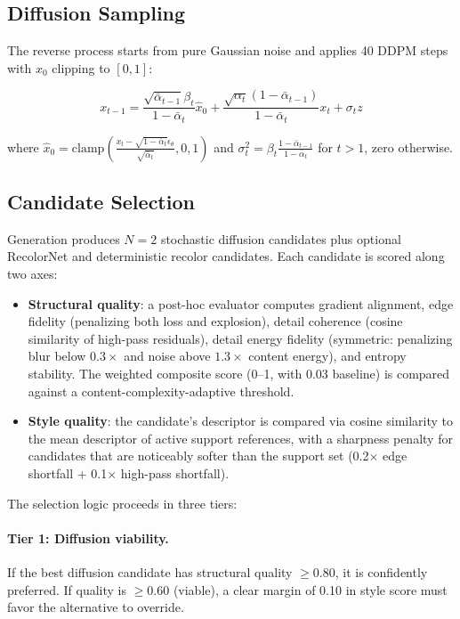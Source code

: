 \subsection{Diffusion Sampling}

The reverse process starts from pure Gaussian noise and applies 40 DDPM steps with $x_0$ clipping to $[0,1]$:

\begin{equation}
    x_{t-1} = \frac{\sqrt{\bar{\alpha}_{t-1}}\beta_t}{1-\bar{\alpha}_t}\hat{x}_0 + \frac{\sqrt{\alpha_t}(1-\bar{\alpha}_{t-1})}{1-\bar{\alpha}_t}x_t + \sigma_t z
\end{equation}

where $\hat{x}_0 = \text{clamp}(\frac{x_t - \sqrt{1-\bar{\alpha}_t}\epsilon_\theta}{\sqrt{\bar{\alpha}_t}}, 0, 1)$ and $\sigma_t^2 = \beta_t\frac{1-\bar{\alpha}_{t-1}}{1-\bar{\alpha}_t}$ for $t>1$, zero otherwise.

\subsection{Candidate Selection}

Generation produces $N=2$ stochastic diffusion candidates plus optional RecolorNet and deterministic recolor candidates. Each candidate is scored along two axes:

\begin{itemize}
    \item \textbf{Structural quality}: a post-hoc evaluator computes gradient alignment, edge fidelity (penalizing both loss and explosion), detail coherence (cosine similarity of high-pass residuals), detail energy fidelity (symmetric: penalizing blur below $0.3\times$ and noise above $1.3\times$ content energy), and entropy stability. The weighted composite score (0--1, with 0.03 baseline) is compared against a content-complexity-adaptive threshold.
    \item \textbf{Style quality}: the candidate's descriptor is compared via cosine similarity to the mean descriptor of active support references, with a sharpness penalty for candidates that are noticeably softer than the support set (0.2$\times$ edge shortfall + 0.1$\times$ high-pass shortfall).
\end{itemize}

The selection logic proceeds in three tiers:

\paragraph{Tier 1: Diffusion viability.} If the best diffusion candidate has structural quality $\geq 0.80$, it is confidently preferred. If quality is $\geq 0.60$ (viable), a clear margin of 0.10 in style score must favor the alternative to override.

